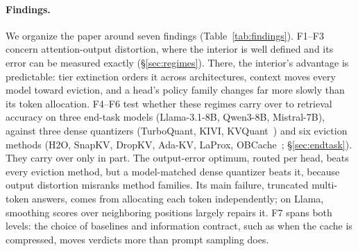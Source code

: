 \documentclass{article}
\theoremstyle{definition}
\begin{document}
\paragraph{Findings.}  We organize the paper around seven findings (Table~\ref{tab:findings}).  F1--F3 concern attention-output distortion, where the interior is well defined and its error can be measured exactly (\S\ref{sec:regimes}).  There, the interior's advantage is predictable: tier extinction orders it across architectures, context moves every model toward eviction, and a head's policy family changes far more slowly than its token allocation.  F4--F6 test whether these regimes carry over to retrieval accuracy on three end-task models (Llama-3.1-8B, Qwen3-8B, Mistral-7B), against three dense quantizers (TurboQuant, KIVI, KVQuant~\citep{zandieh2025turboquant,liu2024kivi,hooper2024kvquant}) and six eviction methods (H2O, SnapKV, DropKV, Ada-KV, LaProx, OBCache~\citep{zhang2023h2o,li2024snapkv,zhang2026dropkv,feng2024adakv,mai2026laprox,gu2026obcache}; \S\ref{sec:endtask}).  They carry over only in part.  The output-error optimum, routed per head, beats every eviction method, but a model-matched dense quantizer beats it, because output distortion misranks method families.  Its main failure, truncated multi-token answers, comes from allocating each token independently; on Llama, smoothing scores over neighboring positions largely repairs it.  F7 spans both levels: the choice of baselines and information contract, such as when the cache is compressed, moves verdicts more than prompt sampling does.
\end{document}
